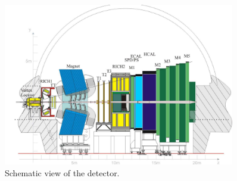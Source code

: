 \begin{figure}
\centering
\includegraphics[width=0.9\textwidth]{figs/detector/lhcb-run1.pdf}
\caption{Schematic view of the \lhcb detector.}
\label{fig:lhcb-run1}
\end{figure}

